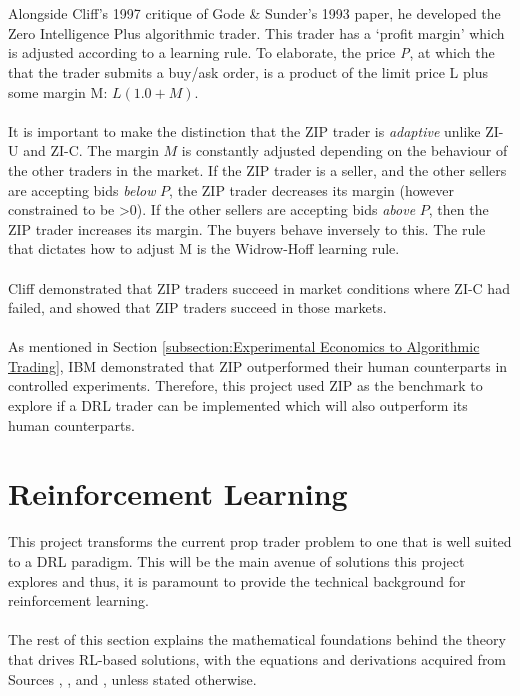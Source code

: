 \documentclass[ %
                    author={Ashwinder Khurana},
                supervisor={Prof Dave Cliff},
                    degree={MEng},
                     title={The Deeply Reinforced Trader},
                  subtitle={},
                      type={enterprise},
                      year={2020} ]{dissertation}
\begin{document}
\\
\\
Alongside Cliff's 1997 critique of Gode \& Sunder's 1993 paper, he developed the Zero Intelligence Plus algorithmic trader. This trader has a \enquote*{profit margin} which is adjusted according to a learning rule. To elaborate, the price \textit{P}, at which the that the trader submits a buy/ask order, is a product of the limit price L plus some margin M: $L(1.0 + M)$. 
\\
\\
\noindent
It is important to make the distinction that the ZIP trader is \textit{adaptive} unlike ZI-U and ZI-C. The margin $M$ is constantly adjusted depending on the behaviour of the other traders in the market. If the ZIP trader is a seller, and the other sellers are accepting bids \textit{below} $P$, the ZIP trader decreases its margin (however constrained to be \textgreater 0). If the other sellers are accepting bids \textit{above} $P$, then the ZIP trader increases its margin. The buyers behave inversely to this. The rule that dictates how to adjust M is the Widrow-Hoff learning rule.
\\
\\
Cliff demonstrated that ZIP traders succeed in market conditions where ZI-C had failed, and showed that ZIP traders succeed in those markets.   
\\
\\
As mentioned in Section \ref{subsection:Experimental Economics to Algorithmic Trading}, IBM demonstrated that ZIP outperformed their human counterparts in controlled experiments. Therefore, this project used ZIP as the benchmark to explore if a DRL trader can be implemented which will also outperform its human counterparts.  

\section{Reinforcement Learning}

This project transforms the current prop trader problem to one that is well suited to a DRL paradigm. This will be the main avenue of solutions this project explores and thus, it is paramount to provide the technical background for reinforcement learning.
\\
\\
The rest of this section explains the mathematical foundations behind the theory that drives RL-based solutions, with the equations and derivations acquired from Sources \cite{MDP-demystified}, \cite{rearrange-value-function}, and \cite{david-silver-teaching}, unless stated otherwise.
\end{document}
